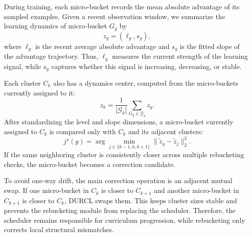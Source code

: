 \documentclass[10pt]{article}
\begin{document}
During training, each micro-bucket records the mean absolute advantage of its sampled examples. Given a recent observation window, we summarize the learning dynamics of micro-bucket $G_g$ by
\begin{equation}
z_g=(\ell_g,s_g),
\end{equation}
where $\ell_g$ is the recent average absolute advantage and $s_g$ is the fitted slope of the advantage trajectory. Thus, $\ell_g$ measures the current strength of the learning signal, while $s_g$ captures whether this signal is increasing, decreasing, or stable.

Each cluster $C_k$ also has a dynamics center, computed from the micro-buckets currently assigned to it:
\begin{equation}
z_k=\frac{1}{|\mathcal{G}_k|}\sum_{G_g\in\mathcal{G}_k}z_g.
\end{equation}
After standardizing the level and slope dimensions, a micro-bucket currently assigned to $C_k$ is compared only with $C_k$ and its adjacent clusters:
\begin{equation}
j^\star(g)=
\arg\min_{j\in\{k-1,k,k+1\}}
\|\tilde z_g-\tilde z_j\|_2^2.
\end{equation}
If the same neighboring cluster is consistently closer across multiple rebucketing checks, the micro-bucket becomes a correction candidate.

To avoid one-way drift, the main correction operation is an adjacent mutual swap. If one micro-bucket in $C_k$ is closer to $C_{k+1}$ and another micro-bucket in $C_{k+1}$ is closer to $C_k$, DURCL swaps them. This keeps cluster sizes stable and prevents the rebucketing module from replacing the scheduler. Therefore, the scheduler remains responsible for curriculum progression, while rebucketing only corrects local structural mismatches.
\end{document}
